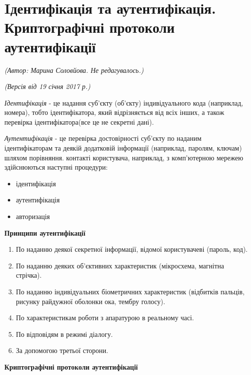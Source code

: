 \section{Iдентифікація та аутентифікація. Криптографічні протоколи аутентифікації}
\begin{flushright}
\emph{(Автор: Марина Соловйова. Не редагувалось.)}
\par \emph{(Версія від 19 січня 2017 р.)}
\end{flushright}

\par\emph{Ідентифікація} - це надання суб'єкту (об'єкту) індивідуального кода (наприклад, номера), тобто ідентифікатора, який відрізняється від всіх інших, а також перевірка ідентифікатора(все це не секретні дані). \par
\emph{Аутентифікація} - це перевірка достовірності суб'єкту по наданим ідентифікаторам та деякій додатковій інформації (наприклад, паролям, ключам) шляхом порівняння.
 контакті користувача, наприклад, з комп'ютерною мережею здійснюються наступні процедури:

\begin{itemize}
\item ідентифікація
\item аутентифікація
\item авторизація
\end{itemize}

\begin{center}
\textbf{Принципи аутентифікації}
\end{center}

\begin{enumerate}
\setcounter{enumi}{0}
\item По наданню деякої секретної інформації, відомої користувачеві (пароль, код).
\item По наданню деяких об'єктивних характеристик (мікросхема, магнітна стрічка).
\item По наданню індивідуальних біометричних характеристик (відбитків пальців, рисунку райдужної оболонки ока, тембру голосу).
\item По характеристикам роботи з апаратурою в реальному часі.
\item По відповідям в режимі діалогу.
\item За допомогою третьої сторони.
\end{enumerate}

\begin{center}
\textbf{Криптографічні протоколи аутентифікації}
\end{center}

